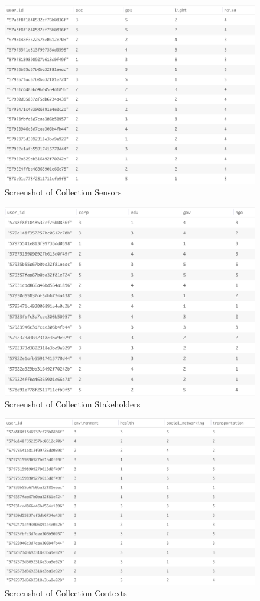 \begin{figure}[ht!]
\centering
\includegraphics[width=\textwidth,keepaspectratio,height=0.6\textwidth]{./images/collection_sensors_cat}
\caption{Screenshot of Collection Sensors}
\label{fig:col_s}
\end{figure}

\begin{figure}[ht!]
\centering
\includegraphics[width=\textwidth,keepaspectratio,height=0.6\textwidth]{./images/collection_dc_cat}
\caption{Screenshot of Collection Stakeholders}
\label{fig:col_ss}
\end{figure}

\begin{figure}[ht!]
\centering
\includegraphics[width=\textwidth,keepaspectratio,height=0.6\textwidth]{./images/collection_context_cat}
\caption{Screenshot of Collection Contexts}
\label{fig:col_c}
\end{figure}

